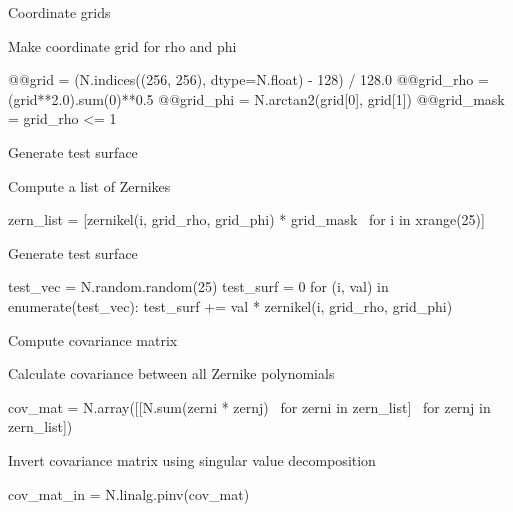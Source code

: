 \documentclass[xetex,10pt]{beamer}
\def\spacer{\vspace*{1em}}
\begin{document}
\begin{frame}[fragile]{Coordinate grids}

Make coordinate grid for rho and phi
\spacer
\begin{python}
@@grid = (N.indices((256, 256), dtype=N.float) - 128) / 128.0
@@grid_rho = (grid**2.0).sum(0)**0.5
@@grid_phi = N.arctan2(grid[0], grid[1])
@@grid_mask = grid_rho <= 1
\end{python}
\end{frame}

\begin{frame}[fragile]{Generate test surface}

Compute a list of Zernikes

\begin{python}
zern_list = [zernikel(i, grid_rho, grid_phi) * grid_mask \
  for i in xrange(25)]
\end{python}

\spacer
\pause
Generate test surface

\begin{python}
test_vec = N.random.random(25)
test_surf = 0
for (i, val) in enumerate(test_vec):
  test_surf += val * zernikel(i, grid_rho, grid_phi)
\end{python}
\end{frame}

\begin{frame}[fragile]{Compute covariance matrix}

Calculate covariance between all Zernike polynomials

\begin{python}
cov_mat = N.array([[N.sum(zerni * zernj) \
  for zerni in zern_list] \
    for zernj in zern_list])
\end{python}

\spacer
\pause
Invert covariance matrix using singular value decomposition
\begin{python}
cov_mat_in = N.linalg.pinv(cov_mat)
\end{python}

\end{frame}
\end{document}
